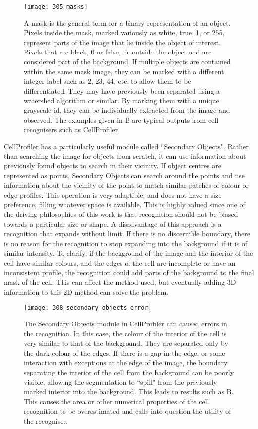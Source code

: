 \begin{figure}[h!]
 \centering
 \texttt{[image: 305\_masks]}
 \caption[Object masks]{
 	A mask is the general term for a binary representation of an object. Pixels inside the mask, marked variously as white, true, 1, or 255, represent parts of the image that lie inside the object of interest. Pixels that are black, 0 or false, lie outside the object and are considered part of the background. If multiple objects are contained within the same mask image, they can be marked with a different integer label such as 2, 23, 44, etc. to allow them to be differentiated. They may have previously been separated using a watershed algorithm or similar. By marking them with a unique grayscale id, they can be individually extracted from the image and observed. The examples given in B are typical outputs from cell recognisers such as CellProfiler.
 }
 \label{fig:masks}
\end{figure}

CellProfiler has a particularly useful module called ``Secondary Objects". Rather than searching the image for objects from scratch, it can use information about previously found objects to search in their vicinity. If object centres are represented as points, Secondary Objects can search around the points and use information about the vicinity of the point to match similar patches of colour or edge profiles. This operation is very adaptible, and does not have a size preference, filling whatever space is available. This is highly valued since one of the driving philosophies of this work is that recognition should not be biased towards a particular size or shape. A disadvantage of this approach is a recognition that expands without limit. If there is no discernible boundary, there is no reason for the recognition to stop expanding into the background if it is of similar intensity. To clarify, if the background of the image and the interior of the cell have similar colours, and the edges of the cell are incomplete or have an inconsistent profile, the recognition could add parts of the background to the final mask of the cell. This can affect the method used, but eventually adding 3D information to this 2D method can solve the problem.

\begin{figure}[h!]
 \centering
 \texttt{[image: 308\_secondary\_objects\_error]}
 \caption[Secondary object error example]{
 	The Secondary Objects module in CellProfiler can caused errors in the recognition. In this case, the colour of the interior of the cell is very similar to that of the background. They are separated only by the dark colour of the edges. If there is a gap in the edge, or some interaction with exceptions at the edge of the image, the boundary separating the interior of the cell from the background can be poorly visible, allowing the segmentation to ``spill" from the previously marked interior into the background. This leads to results such as B. This causes the area or other numerical properties of the cell recognition to be overestimated and calls into question the utility of the recogniser.
 }
 \label{fig:secondaryobjecterror}
\end{figure}

